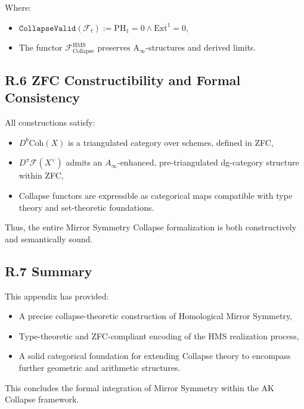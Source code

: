 \documentclass[11pt]{article}
\begin{document}
Where:
\begin{itemize}
  \item $\texttt{CollapseValid}(\mathcal{F}_t) := \mathrm{PH}_1 = 0 \wedge \mathrm{Ext}^1 = 0$,
  \item The functor $\mathcal{F}_{\mathrm{Collapse}}^{\mathrm{HMS}}$ preserves A$_\infty$-structures and derived limits.
\end{itemize}

\subsection*{R.6 ZFC Constructibility and Formal Consistency}

All constructions satisfy:

\begin{itemize}
  \item $D^b\mathrm{Coh}(X)$ is a triangulated category over schemes, defined in ZFC,
  \item $D^\pi\mathcal{F}(X^\vee)$ admits an $A_\infty$-enhanced, pre-triangulated dg-category structure within ZFC,
  \item Collapse functors are expressible as categorical maps compatible with type theory and set-theoretic foundations.
\end{itemize}

Thus, the entire Mirror Symmetry Collapse formalization is both constructively and semantically sound.

\subsection*{R.7 Summary}

This appendix has provided:

\begin{itemize}
  \item A precise collapse-theoretic construction of Homological Mirror Symmetry,
  \item Type-theoretic and ZFC-compliant encoding of the HMS realization process,
  \item A solid categorical foundation for extending Collapse theory to encompass further geometric and arithmetic structures.
\end{itemize}

This concludes the formal integration of Mirror Symmetry within the AK Collapse framework.



\end{document}
